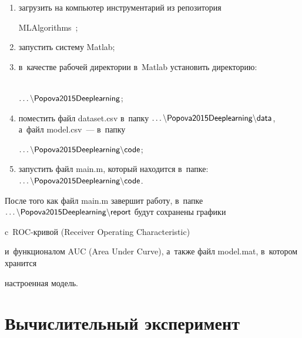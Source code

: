 \begin{enumerate}[(1)]


\item загрузить на компьютер инструментарий из репозитория 


MLAlgorithms~\cite{source_popova};


\item запустить систему Matlab;


\item в~качестве рабочей директории в~Matlab установить директорию: 


\\${\sf \dots\backslash {Popova2015Deeplearning}}$;


\item поместить файл dataset.csv в~папку ${\sf \dots\backslash 


{Popova2015Deeplearning}\backslash {data}}$, а~файл {\sf model.csv}~--- в~папку 


${\sf \dots\backslash {Popova2015Deeplearning}\backslash {code}}$;


\item запустить файл main.m, который находится в~папке:\\


${\sf \dots\backslash  {Popova2015Deeplearning}\backslash {code}}$.





\end{enumerate}





После того как файл main.m завершит работу, в~папке ${\sf \dots\backslash 


{Popova2015Deeplearning}\backslash {report}}$ будут сохранены графики 


c~ROC-кри\-вой (Receiver Operating Characteristic)


и~функционалом AUC (Area Under Curve), а~также файл model.mat, в~котором хранится 


настроенная модель.








\section{Вычислительный эксперимент}





